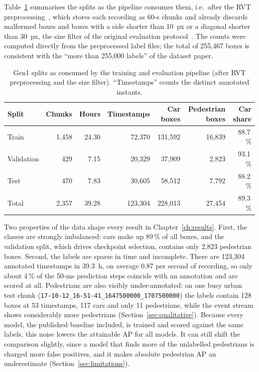 \documentclass[11pt, a4paper]{report}
\begin{document}
Table~\ref{tab:gen1_stats} summarises the splits as the pipeline consumes them, i.e.\ after the RVT
preprocessing~\cite{gehrig2023recurrent}, which stores each recording as 60-s chunks and already
discards malformed boxes and boxes with a side shorter than 10~px or a diagonal shorter than 30~px, the
size filter of the original evaluation protocol~\cite{detournemire2020large}. The counts were computed
directly from the preprocessed label files; the total of 255{,}467 boxes is consistent with the
``more than 255{,}000 labels'' of the dataset paper.

\begin{table}[htbp]
\centering
\small
\caption{Gen1 splits as consumed by the training and evaluation pipeline (after RVT preprocessing and
the size filter). ``Timestamps'' counts the distinct annotated instants.}
\label{tab:gen1_stats}
\begin{tabular}{lrrrrrr}
\toprule
Split & Chunks & Hours & Timestamps & Car boxes & Pedestrian boxes & Car share \\
\midrule
Train      & 1{,}458 & 24.30 &  72{,}370 & 131{,}592 & 16{,}839 & 88.7\,\% \\
Validation &     429 &  7.15 &  20{,}329 &  37{,}909 &  2{,}823 & 93.1\,\% \\
Test       &     470 &  7.83 &  30{,}605 &  58{,}512 &  7{,}792 & 88.2\,\% \\
\midrule
Total      & 2{,}357 & 39.28 & 123{,}304 & 228{,}013 & 27{,}454 & 89.3\,\% \\
\bottomrule
\end{tabular}
\end{table}

Two properties of the data shape every result in Chapter~\ref{ch:results}. First, the classes are
strongly imbalanced: cars make up 89\,\% of all boxes, and the validation split, which drives checkpoint
selection, contains only 2{,}823 pedestrian boxes. Second, the labels are sparse in time and incomplete.
There are 123{,}304 annotated timestamps in 39.3~h, on average 0.87 per second of recording, so only
about 4\,\% of the 50-ms prediction steps coincide with an annotation and are scored at all. Pedestrians
are also visibly under-annotated: on one busy urban test chunk
(\texttt{17-10-12\_16-51-41\_1647500000\_1707500000}) the labels contain 128 boxes at 53 timestamps,
117 cars and only 11 pedestrians, while the event stream shows considerably more pedestrians
(Section~\ref{sec:qualitative}). Because every model, the published baseline included, is trained and
scored against the same labels, this noise lowers the attainable AP for all models. It can still shift
the comparison slightly, since a model that finds more of the unlabelled pedestrians is charged more false
positives, and it makes absolute pedestrian AP an underestimate (Section~\ref{sec:limitations}).
\end{document}
